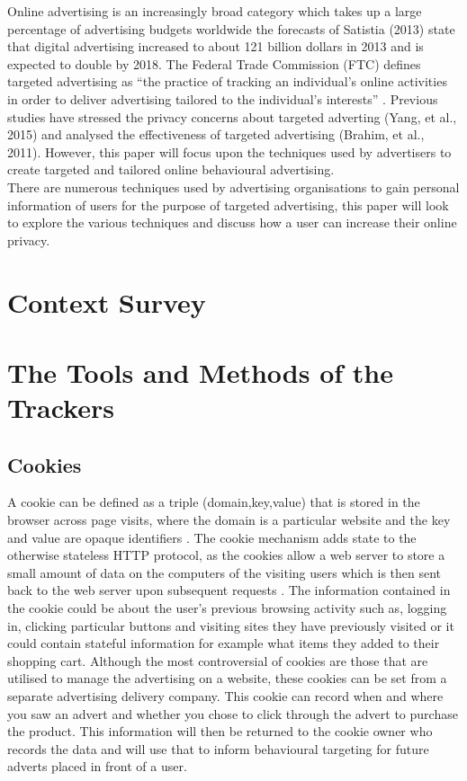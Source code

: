\documentclass[12pt]{article}
\begin{document}
Online advertising is an increasingly broad category which takes up a large percentage of advertising budgets worldwide the forecasts of Satistia (2013) state that digital advertising increased to about 121 billion dollars in 2013 and is expected to double by 2018. The Federal Trade Commission (FTC) defines targeted advertising as ``the practice of tracking an individual’s online activities in order to deliver advertising tailored to the individual’s interests'' \parencite{comission2009}. Previous studies have stressed the privacy concerns about targeted adverting (Yang, et al., 2015) and analysed the effectiveness of targeted advertising (Brahim, et al., 2011). However, this paper will focus upon the techniques used by  advertisers to create targeted and tailored online behavioural advertising. \\

There are numerous techniques used by advertising organisations to gain personal information of users for the purpose of targeted advertising, this paper will look to explore the various techniques and discuss how a user can increase their online privacy. 

\section{Context Survey}

\section{The Tools and Methods of the Trackers}


\subsection {Cookies} \label{cookies}
A cookie can be defined as a triple (domain,key,value) that is stored in the browser across page visits, where the domain is a particular website and the key and value are opaque identifiers \parencite{roesner}. The cookie mechanism adds state to the otherwise stateless HTTP protocol, as the cookies allow a web server to store a small amount of data on the computers of the visiting users which is then sent back to the web server upon subsequent requests \parencite{cookielessMonster}. The information contained in the cookie could be about the user's previous browsing activity such as, logging in, clicking particular buttons and visiting sites they have previously visited or it could contain stateful information for example what items they added to their shopping cart. Although the most controversial of cookies are those that are utilised to manage the advertising on a website, these cookies can be set from a separate advertising delivery company. This cookie can record when and where you saw an advert and whether you chose to click through the advert to purchase the product. This information will then be returned to the cookie owner who records the data and will use that to inform behavioural targeting for future adverts placed in front of a user.  \newline 
\end{document}
